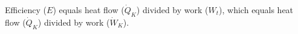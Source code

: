 Efficiency (\( E \)) equals heat flow (\( \dot{Q}_K \)) divided by work (\( W_t \)), which equals heat flow (\( \dot{Q}_K \)) divided by work (\( \dot{W}_K \)).